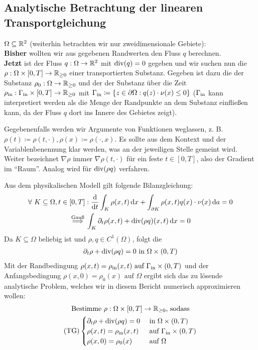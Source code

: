 
\subsection{Analytische Betrachtung der linearen Transportgleichung}
$ \Omega \subseteq \mathbb{R}^2 $ (weiterhin betrachten wir nur zweidimensionale Gebiete):\\
\textbf{Bisher} wollten wir aus gegebenen Randwerten den Fluss $ q $ berechnen.\\
\textbf{Jetzt} ist  der Fluss $ q: \Omega \to \mathbb{R}^2 $ mit $ \operatorname{div}(q) = 0 $ gegeben und wir suchen nun die  $ \rho: \Omega \times [0,T] \to \mathbb{R}_{\geq 0} $ einer 
transportierten Substanz. Gegeben ist dazu die  der Substanz $ \rho_0:  \Omega \to \mathbb{R}_{\geq 0}$ und der  der Substanz über die Zeit $ \rho_{\text{in}}: \Gamma_{{\text{in}}} \times [0,T] \to \mathbb{R}_{\geq 0} $ mit $ \Gamma_{{\text{in}}} \coloneqq \{ z \in \partial \Omega: q(z) \cdot \nu(x) \leq 0 \} $ ($ \Gamma_{{\text{in}}} $ kann interpretiert werden als die Menge der Randpunkte an dem Substanz einfließen kann, da der Fluss $ q $ dort ins Innere des Gebietes zeigt).

Gegebenenfalls werden wir Argumente von Funktionen weglassen, z. B. $ \rho(t) \coloneqq \rho(t,\cdot), \rho(x) \coloneqq \rho(\cdot, x) $. Es sollte aus dem Kontext und der Variablenbenennung klar werden, was an der jeweiligen Stelle gemeint wird. Weiter bezeichnet $ \nabla \rho $ immer $ \nabla \rho(t,\cdot) $ für ein feste $ t \in [0,T] $, also der Gradient  im \enquote{Raum}. Analog wird für $ \operatorname{div}(\rho q) $ verfahren.

Aus dem physikalischen Modell gilt folgende Bilanzgleichung:
\begin{gather*}
	\forall \ K \subseteq \Omega, t \in [0,T]: \frac{\mathop{}\!\mathrm{d}}{\mathop{}\!\mathrm{d} t} \int_K \rho(x,t) \mathop{}\!\mathrm{d} x + \int_{\partial K} \rho(x,t) q(x) \cdot \nu(x) \mathop{}\!\mathrm{d} a = 0 \\
	\stackrel{\text{Gauß}}{\implies} \int_K \partial_t \rho(x,t) + \operatorname{div}(\rho q)(x,t) \mathop{}\!\mathrm{d} x = 0 
\end{gather*}
Da $ K \subseteq \Omega $ beliebig ist und $ \rho, q \in C^1(\Omega) $, folgt die 
\begin{gather*}
	\partial_t \rho + \operatorname{div}(\rho q) = 0 \text{ in } \Omega \times (0,T) 
\end{gather*}
Mit der Randbedingung $ \rho(x,t) = \rho_{\text{in}}(x,t) \text{ auf } \Gamma_{{\text{in}}} \times (0,T)$ und der Anfangsbedingung $ \rho(x,0) = \rho_0(x) \text{ auf } \Omega $ ergibt sich das zu lösende analytische Problem, welches wir in diesem Bericht numerisch approximieren wollen:
\begin{gather*}
	\text{Bestimme } \rho: \Omega \times [0,T] \to \mathbb{R}_{\geq 0} \text{, sodass}\\
	\operatorname{(TG)}
	\begin{cases}
		\partial_t \rho + \operatorname{div}(\rho q) = 0 &\text{ in } \Omega \times (0,T)\\
		\rho(x,t) = \rho_{\text{in}}(x,t) &\text{ auf } \Gamma_{{\text{in}}} \times (0,T)\\
		\rho(x,0) = \rho_0(x) &\text{ auf } \Omega
	\end{cases}
\end{gather*}



